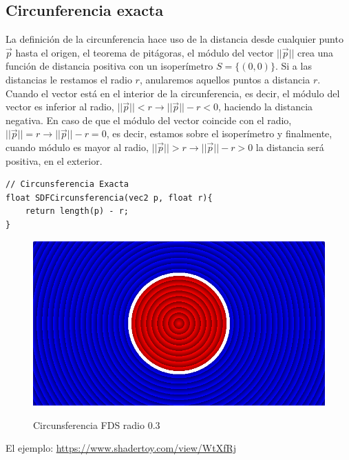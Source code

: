 \subsection{Circunferencia exacta}
La definición de la circunferencia  hace uso de la distancia desde cualquier punto \(\Vec{p}\) hasta el origen, el teorema de pitágoras, el módulo del vector \(\vert\vert\Vec{p}\vert\vert\)  crea una función de distancia positiva con un isoperímetro \(S=\{(0,0)\}\). Si a las distancias le restamos el radio \(r\), anularemos aquellos puntos a distancia \(r\). Cuando el vector está en el interior de la circunferencia, es decir, el módulo del vector es inferior al radio, \(\vert\vert\Vec{p}\vert\vert < r \longrightarrow \vert\vert\Vec{p}\vert\vert - r < 0\), haciendo la distancia negativa. En caso de que el módulo del vector coincide con el radio, \(\vert\vert\Vec{p}\vert\vert = r \longrightarrow \vert\vert\Vec{p}\vert\vert - r = 0\), es decir, estamos sobre el isoperímetro y finalmente, cuando módulo es mayor al radio, \(\vert\vert\Vec{p}\vert\vert > r \longrightarrow \vert\vert\Vec{p}\vert\vert - r > 0\) la distancia será positiva, en el exterior.
\begin{lstlisting}
// Circunsferencia Exacta
float SDFCircunsferencia(vec2 p, float r){
    return length(p) - r;
}
\end{lstlisting}
\begin{figure}[H]
  \centering
  \captionsetup{justification=centering}%
  \includegraphics[width=1.0\textwidth]{secciones/imagenes/sdf/2d/sdf_circunsferencia.png}\label{fig:circ}
  \caption{Circunsferencia FDS radio \(0.3\)}
\end{figure}

El ejemplo: \url{https://www.shadertoy.com/view/WtXfRj}

